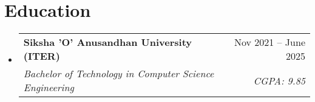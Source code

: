 
\newcommand{\resumeItem}[1]{
  \item\small{
    {#1 \vspace{-2pt}}
  }
}

\newcommand{\resumeSubheading}[4]{
  \vspace{2pt}\item
  \begin{tabular*}{0.97\textwidth}[t]{l@{\extracolsep{\fill}}r}
    \textbf{#1} & #2 \\
    \textit{\small#3} & \textit{\small #4} \\
  \end{tabular*}\vspace{-5pt}
}

\newcommand{\resumeSubSubheading}[2]{
  \item
  \begin{tabular*}{0.97\textwidth}{l@{\extracolsep{\fill}}r}
    \textit{\small#1} & \textit{\small #2} \\
  \end{tabular*}\vspace{-7pt}
}

\newcommand{\resumeProjectHeading}[2]{
  \item
  \begin{tabular*}{0.97\textwidth}{l@{\extracolsep{\fill}}r}
    \small#1 & #2 \\
  \end{tabular*}\vspace{-5pt}
}

\newcommand{\resumeSubItem}[1]{\resumeItem{#1}\vspace{-4pt}}

\renewcommand\labelitemii{$\vcenter{\hbox{\tiny$\bullet$}}$}

\newcommand{\resumeSubHeadingListStart}{\begin{itemize}[leftmargin=0.15in, label={}]}
    \newcommand{\resumeSubHeadingListEnd}{\vspace{-10pt}\end{itemize}}
\newcommand{\resumeItemListStart}{\begin{itemize}}
    \newcommand{\resumeItemListEnd}{\end{itemize}\vspace{0pt}}

\section{Education}
\resumeSubHeadingListStart
\resumeSubheading
{Siksha 'O' Anusandhan University (ITER)}{Nov 2021 -- June 2025}
{Bachelor of Technology in Computer Science Engineering}{ CGPA: 9.85 }
\resumeSubHeadingListEnd


